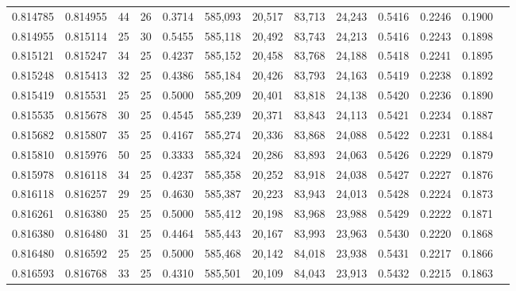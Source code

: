 \begin{tabular}{rrrrrrrrrrrrr}
0.814785 & 0.814955 &    44 &  26 &                                     0.3714 & 585,093 &  20,517 &  83,713 &  24,243 & 0.5416 & 0.2246 & 0.1900 \\
0.814955 & 0.815114 &    25 &  30 &                                     0.5455 & 585,118 &  20,492 &  83,743 &  24,213 & 0.5416 & 0.2243 & 0.1898 \\
0.815121 & 0.815247 &    34 &  25 &                                     0.4237 & 585,152 &  20,458 &  83,768 &  24,188 & 0.5418 & 0.2241 & 0.1895 \\
0.815248 & 0.815413 &    32 &  25 &                                     0.4386 & 585,184 &  20,426 &  83,793 &  24,163 & 0.5419 & 0.2238 & 0.1892 \\
0.815419 & 0.815531 &    25 &  25 &                                     0.5000 & 585,209 &  20,401 &  83,818 &  24,138 & 0.5420 & 0.2236 & 0.1890 \\
0.815535 & 0.815678 &    30 &  25 &                                     0.4545 & 585,239 &  20,371 &  83,843 &  24,113 & 0.5421 & 0.2234 & 0.1887 \\
0.815682 & 0.815807 &    35 &  25 &                                     0.4167 & 585,274 &  20,336 &  83,868 &  24,088 & 0.5422 & 0.2231 & 0.1884 \\
0.815810 & 0.815976 &    50 &  25 &                                     0.3333 & 585,324 &  20,286 &  83,893 &  24,063 & 0.5426 & 0.2229 & 0.1879 \\
0.815978 & 0.816118 &    34 &  25 &                                     0.4237 & 585,358 &  20,252 &  83,918 &  24,038 & 0.5427 & 0.2227 & 0.1876 \\
0.816118 & 0.816257 &    29 &  25 &                                     0.4630 & 585,387 &  20,223 &  83,943 &  24,013 & 0.5428 & 0.2224 & 0.1873 \\
0.816261 & 0.816380 &    25 &  25 &                                     0.5000 & 585,412 &  20,198 &  83,968 &  23,988 & 0.5429 & 0.2222 & 0.1871 \\
0.816380 & 0.816480 &    31 &  25 &                                     0.4464 & 585,443 &  20,167 &  83,993 &  23,963 & 0.5430 & 0.2220 & 0.1868 \\
0.816480 & 0.816592 &    25 &  25 &                                     0.5000 & 585,468 &  20,142 &  84,018 &  23,938 & 0.5431 & 0.2217 & 0.1866 \\
0.816593 & 0.816768 &    33 &  25 &                                     0.4310 & 585,501 &  20,109 &  84,043 &  23,913 & 0.5432 & 0.2215 & 0.1863 \\

\end{tabular}
